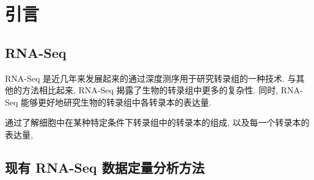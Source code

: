 \chapter{引言}

\section{RNA-Seq}
\nocite{wang2009rna}

RNA-Seq 是近几年来发展起来的通过深度测序用于研究转录组的一种技术. 
与其他的方法相比起来, RNA-Seq 揭露了生物的转录组中更多的复杂性. 
同时, RNA-Seq 能够更好地研究生物的转录组中各转录本的表达量. 

通过了解细胞中在某种特定条件下转录组中的转录本的组成, 
以及每一个转录本的表达量, 

\section{现有 RNA-Seq 数据定量分析方法}


